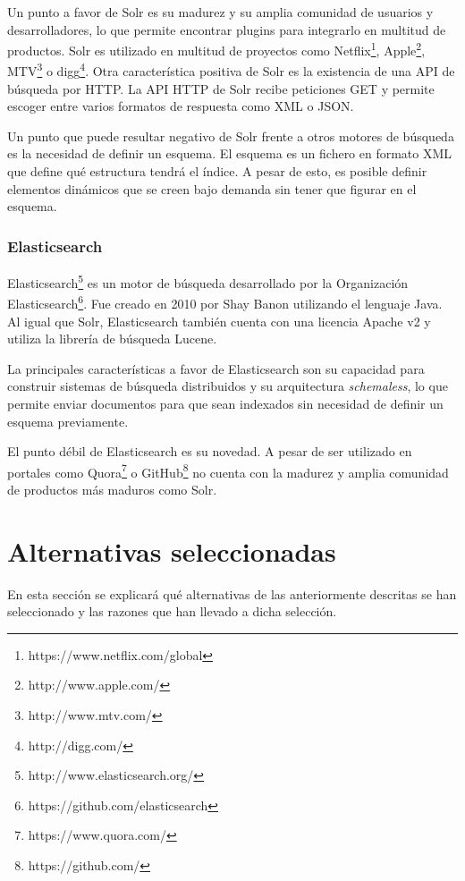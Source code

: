 Un punto a favor de Solr es su madurez y su amplia comunidad de usuarios y desarrolladores, lo que permite encontrar plugins para integrarlo en multitud de productos. Solr es utilizado en multitud de proyectos como Netflix\footnote{https://www.netflix.com/global}, Apple\footnote{http://www.apple.com/}, MTV\footnote{http://www.mtv.com/} o digg\footnote{http://digg.com/}. \newline
Otra característica positiva de Solr es la existencia de una API de búsqueda por HTTP. La API HTTP de Solr recibe peticiones GET y permite escoger entre varios formatos de respuesta como XML o JSON.

Un punto que puede resultar negativo de Solr frente a otros motores de búsqueda es la necesidad de definir un esquema.  El esquema es un fichero en formato XML que define qué estructura tendrá el índice.  A pesar de esto, es posible definir elementos dinámicos que se creen bajo demanda sin tener que figurar en el esquema.

\subsubsection{Elasticsearch}
Elasticsearch\footnote{http://www.elasticsearch.org/} es un motor de búsqueda desarrollado por la Organización Elasticsearch\footnote{https://github.com/elasticsearch}.  Fue creado en 2010 por Shay Banon utilizando el lenguaje Java.  Al igual que Solr, Elasticsearch también cuenta con una licencia Apache v2 y utiliza la librería de búsqueda Lucene.

La principales características a favor de Elasticsearch son su capacidad para construir sistemas de búsqueda distribuidos y su arquitectura \textit{schemaless}, lo que permite enviar documentos para que sean indexados sin necesidad de definir un esquema previamente.

El punto débil de Elasticsearch es su novedad. A pesar de ser utilizado en portales como Quora\footnote{https://www.quora.com/} o GitHub\footnote{https://github.com/} no cuenta con la madurez y amplia comunidad de productos más maduros como Solr.



\section{Alternativas seleccionadas}
En esta sección se explicará qué alternativas de las anteriormente descritas se han seleccionado y las razones que han llevado a dicha selección.

